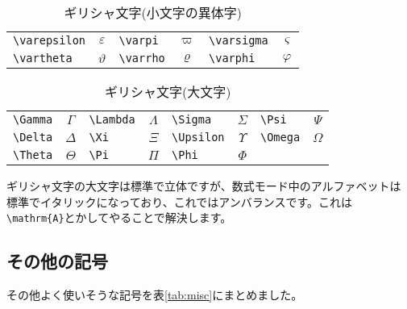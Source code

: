 \begin{table}[htbp]
\begin{center}
\caption{ギリシャ文字(小文字の異体字)}
\label{tab:GreevarLow}
\begin{tabular}{lc|lc|lc}
 \verb+\varepsilon+ & $\varepsilon$ & \verb+\varpi+  & $\varpi$  &
 \verb+\varsigma+   & $\varsigma$   \\
 \verb+\vartheta+   & $\vartheta$   & \verb+\varrho+ & $\varrho$ &
 \verb+\varphi+     & $\varphi$
\end{tabular}
\end{center}
\end{table}

\begin{table}[htbp]
\begin{center}
\caption{ギリシャ文字(大文字)}
\label{tab:GreeUp}
\begin{tabular}{lc|lc|lc|lc}
 \verb+\Gamma+   & $\Gamma$   & \verb+\Lambda+  & $\Lambda$  &
 \verb+\Sigma+   & $\Sigma$   & \verb+\Psi+     & $\Psi$     \\
 \verb+\Delta+   & $\Delta$   & \verb+\Xi+      & $\Xi$      &
 \verb+\Upsilon+ & $\Upsilon$ & \verb+\Omega+   & $\Omega$   \\
 \verb+\Theta+   & $\Theta$   & \verb+\Pi+      & $\Pi$      &
 \verb+\Phi+     & $\Phi$     &               &            \\
\end{tabular}
\end{center}
\end{table}
ギリシャ文字の大文字は標準で立体ですが、数式モード中のアルファベットは
標準でイタリックになっており、これではアンバランスです。これは
\verb+\mathrm{A}+とかしてやることで解決します。

\subsection{その他の記号}
その他よく使いそうな記号を表\ref{tab:misc}にまとめました。

